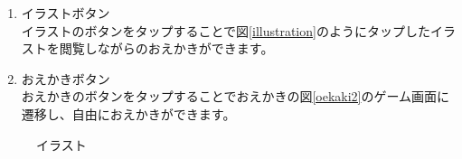 \documentclass[a4j]{jarticle}
\begin{document}
\begin{enumerate}
  \renewcommand{\labelenumi}{\textcircled{\scriptsize \theenumi}}
\item イラストボタン\\
  イラストのボタンをタップすることで図\ref{illustration}のようにタップしたイラストを閲覧しながらのおえかきができます。
\item おえかきボタン\\
  おえかきのボタンをタップすることでおえかきの図\ref{oekaki2}のゲーム画面に遷移し、自由におえかきができます。
\end{enumerate}

\begin{figure}[H]
    \begin{center}
    \caption {イラスト}
    \label{illustraion}
    \end{center}
\end{figure}
\end{document}
